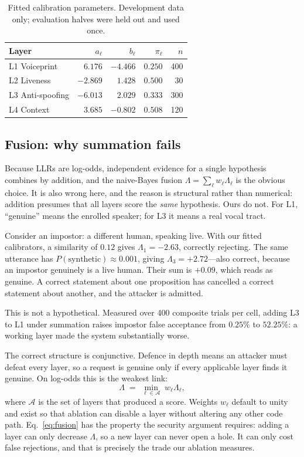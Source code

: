 \documentclass[conference]{IEEEtran}
\begin{document}
\begin{table}[t]
\caption{Fitted calibration parameters. Development data only; evaluation
halves were held out and used once.}
\label{tab:cal}
\centering
\footnotesize
\begin{tabular}{@{}lrrrr@{}}
\toprule
\textbf{Layer} & \textbf{$a_\ell$} & \textbf{$b_\ell$} & \textbf{$\pi_\ell$} & \textbf{$n$} \\
\midrule
L1 Voiceprint    & $6.176$  & $-4.466$ & $0.250$ & 400 \\
L2 Liveness      & $-2.869$ & $1.428$  & $0.500$ & 30 \\
L3 Anti-spoofing & $-6.013$ & $2.029$  & $0.333$ & 300 \\
L4 Context       & $3.685$  & $-0.802$ & $0.508$ & 120 \\
\bottomrule
\end{tabular}
\end{table}

\subsection{Fusion: why summation fails}
\label{sec:fusion}

Because LLRs are log-odds, independent evidence for a single hypothesis
combines by addition, and the naive-Bayes fusion
$\Lambda = \sum_\ell w_\ell \Lambda_\ell$ is the obvious choice. It is also
wrong here, and the reason is structural rather than numerical: addition
presumes that all layers score the \emph{same} hypothesis. Ours do not. For L1,
``genuine'' means the enrolled speaker; for L3 it means a real vocal tract.

Consider an impostor: a different human, speaking live. With our fitted
calibrators, a similarity of $0.12$ gives $\Lambda_1=-2.63$, correctly
rejecting. The same utterance has $P(\text{synthetic})\approx0.001$, giving
$\Lambda_3=+2.72$---also correct, because an impostor genuinely is a live
human. Their sum is $+0.09$, which reads as genuine. A correct statement about
one proposition has cancelled a correct statement about another, and the
attacker is admitted.

This is not a hypothetical. Measured over 400 composite trials per cell, adding
L3 to L1 under summation raises impostor false acceptance from $0.25\%$ to
$52.25\%$: a working layer made the system substantially worse.

The correct structure is conjunctive. Defence in depth means an attacker must
defeat every layer, so a request is genuine only if every applicable layer
finds it genuine. On log-odds this is the weakest link:
\begin{equation}
\label{eq:fusion}
\Lambda \;=\; \min_{\ell \in \mathcal{A}} \; w_\ell \Lambda_\ell ,
\end{equation}
where $\mathcal{A}$ is the set of layers that produced a score. Weights
$w_\ell$ default to unity and exist so that ablation can disable a layer
without altering any other code path. Eq.~\eqref{eq:fusion} has the property
the security argument requires: adding a layer can only decrease $\Lambda$, so
a new layer can never open a hole. It can only cost false rejections, and that
is precisely the trade our ablation measures.
\end{document}
